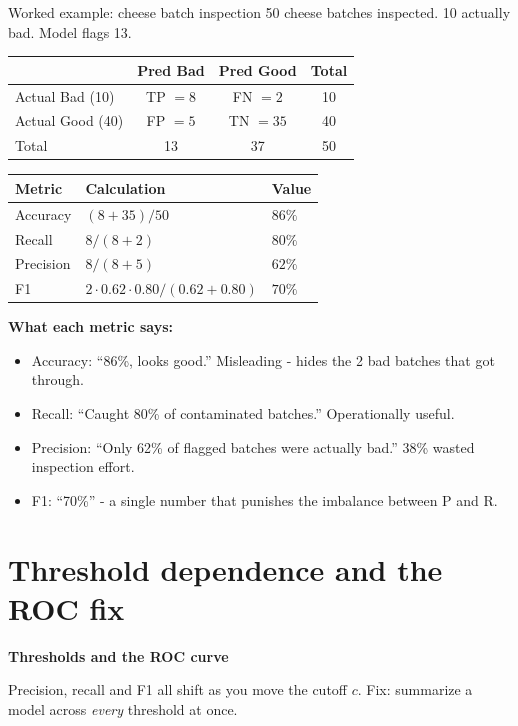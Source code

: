 \documentclass[aspectratio=169]{beamer}
\begin{document}
\begin{frame}{Worked example: cheese batch inspection}
  50 cheese batches inspected. 10 actually bad. Model flags 13.
  \vfill
  \begin{center}\small
    \begin{tabular}{lccc}
       & \textbf{Pred Bad} & \textbf{Pred Good} & \textbf{Total} \\ \hline
      Actual Bad (10) & TP $= 8$ & FN $= 2$ & 10 \\
      Actual Good (40) & FP $= 5$ & TN $= 35$ & 40 \\ \hline
      Total & 13 & 37 & 50
    \end{tabular}
  \end{center}
  \vfill
  \begin{center}\small
    \begin{tabular}{lll}
      \textbf{Metric} & \textbf{Calculation} & \textbf{Value} \\ \hline
      Accuracy & $(8 + 35) / 50$ & $86\%$ \\
      Recall & $8 / (8 + 2)$ & $80\%$ \\
      Precision & $8 / (8 + 5)$ & $62\%$ \\
      F1 & $2 \cdot 0.62 \cdot 0.80 / (0.62 + 0.80)$ & $70\%$ \\
    \end{tabular}
  \end{center}
  \vfill
  \footnotesize \textbf{What each metric says:}
  \begin{itemize}\footnotesize
    \item Accuracy: ``86\%, looks good.'' Misleading - hides the 2 bad batches that got through.
    \item Recall: ``Caught 80\% of contaminated batches.'' Operationally useful.
    \item Precision: ``Only 62\% of flagged batches were actually bad.'' 38\% wasted inspection effort.
    \item F1: ``70\%'' - a single number that punishes the imbalance between P and R.
  \end{itemize}
\end{frame}

\section{Threshold dependence and the ROC fix}

\begin{frame}[plain]
  \vfill
  \begin{center}
    {\Large\color{popblue}\textbf{Thresholds and the ROC curve}}\\[0.9em]
    \begin{minipage}{0.82\textwidth}\centering\small
      Precision, recall and F1 all shift as you move the cutoff $c$. Fix: summarize a
      model across \emph{every} threshold at once.
    \end{minipage}
  \end{center}
  \vfill
\end{frame}
\end{document}
